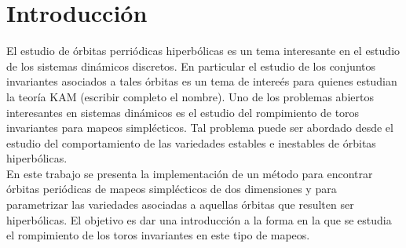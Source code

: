 
\chapter{Introducción}

El estudio de órbitas perri\'odicas hiperb\'olicas es un tema interesante en el estudio de los sistemas din\'amicos discretos. En particular el estudio de los conjuntos invariantes asociados a tales \'orbitas es un tema de intere\'es para quienes estudian la teor\'ia KAM (escribir completo el nombre). Uno de los problemas abiertos interesantes en sistemas din\'amicos es el estudio del rompimiento de toros invariantes para mapeos simpl\'ecticos. Tal problema puede ser abordado desde el estudio del comportamiento de las variedades estables e inestables de \'orbitas hiperb\'olicas. \\

En este trabajo se presenta la implementaci\'on de un m\'etodo para encontrar \'orbitas peri\'odicas de mapeos simpl\'ecticos de dos dimensiones y para parametrizar las variedades asociadas a aquellas \'orbitas que resulten ser hiperb\'olicas. El objetivo es dar una introducci\'on a la forma en la que se  estudia el rompimiento de los toros invariantes en este tipo de mapeos. 

